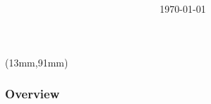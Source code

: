 \documentclass{beamer}
\title[] %
{
}
\subtitle[]{
}
\author[] %
{}
\institute[] %
{
}
\date[] %
{\today}
\newenvironment{reference}{%
\begin{textblock*}{\textwidth}(13mm,91mm)
\centering\footnotesize\bgroup\color{gray!90!black}}{\egroup\end{textblock*}}
\begin{document}

\begin{frame}
\begin{reference}
\end{reference}
  \titlepage
\end{frame}


\begin{frame}
\frametitle{Overview}


\end{frame}
\end{document}
